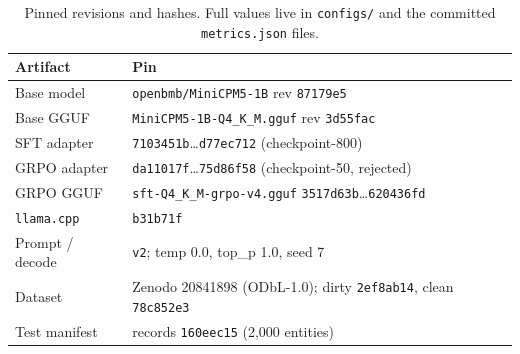 \documentclass[11pt]{article}
\begin{document}
\begin{table}[H]
\centering
\small
\setlength{\tabcolsep}{4pt}
\renewcommand{\arraystretch}{1.18}
\caption{Pinned revisions and hashes. Full values live in
\texttt{configs/} and the committed \texttt{metrics.json} files.}
\label{tab:pins}
\begin{tabularx}{\linewidth}{@{}lX@{}}
\toprule
Artifact & Pin \\
\midrule
Base model & \texttt{openbmb/MiniCPM5-1B} rev \texttt{87179e5} \\
Base GGUF & \texttt{MiniCPM5-1B-Q4\_K\_M.gguf} rev \texttt{3d55fac} \\
SFT adapter & \texttt{7103451b}\dots\texttt{d77ec712} (checkpoint-800) \\
GRPO adapter & \texttt{da11017f}\dots\texttt{75d86f58} (checkpoint-50, rejected) \\
GRPO GGUF & \texttt{sft-Q4\_K\_M-grpo-v4.gguf} \texttt{3517d63b}\dots\texttt{620436fd} \\
\texttt{llama.cpp} & \texttt{b31b71f} \\
Prompt / decode & \texttt{v2}; temp 0.0, top\_p 1.0, seed 7 \\
Dataset & Zenodo 20841898 (ODbL-1.0); dirty \texttt{2ef8ab14}, clean \texttt{78c852e3} \\
Test manifest & records \texttt{160eec15} (2,000 entities) \\
\bottomrule
\end{tabularx}
\end{table}
\end{document}
